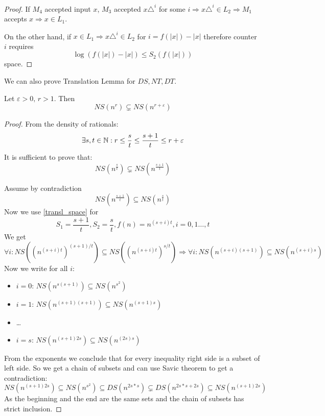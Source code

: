 \begin{proof}
If $M_4$ accepted input $x$, $M_3$ accepted $x\triangle^i$ for some $i \Rightarrow x\triangle^i \in L_2 \Rightarrow M_1$ accepts $x \Rightarrow x \in L_1$.

On the other hand, if $x \in L_1 \Rightarrow x\triangle^i \in L_2$ for $i = f(|x|) - |x|$ therefore counter $i$ requires
\[ \log(f(|x|) - |x|) \leq S_2(f(|x|)) \]
space.

\end{proof}

\begin{note}
	We can also prove Translation Lemma for $DS, NT, DT$.
\end{note}

\begin{theorem}
	Let $\varepsilon > 0,\, r > 1$. Then
	\[ NS(n^r) \subsetneq NS(n^{r + \varepsilon}) \]
\end{theorem}
\begin{proof}
	From the density of rationals:
	\[ \exists s,t \in \operatorname{\mathbb{N}}: r \leq \frac{s}{t} \leq \frac{s + 1}{t} \leq r + \varepsilon \]
	It is sufficient to prove that:
	\[ NS(n^{\frac{s}{t}}) \subsetneq NS(n^{\frac{s + 1}{t}}) \]

	Assume by contradiction
	\[ NS(n^{\frac{s+1}{t}}) \subseteq NS(n^{\frac{s}{t}}) \]
	Now we use \cref{transl_space} for
	\[ S_1 = \frac{s+1}{t}, S_2 = \frac{s}{t}, f(n) = n^{(s + i)t}, i = 0, 1 \ldots, t \]
	We get
	\[ \forall i: NS((n^{(s + i)t})^{(s + 1)/t}) \subseteq NS((n^{(s + i)t})^{s/t}) \Rightarrow \forall i: NS(n^{(s + i)(s + 1)}) \subseteq NS(n^{(s + i)s}) \]
	Now we write for all $i$:
	\begin{itemize}
		\item $i = 0:\, NS(n^{s(s + 1)}) \subseteq NS(n^{s^2}) $
		\item $i = 1:\, NS(n^{(s + 1)(s + 1)}) \subseteq NS(n^{(s + 1)s}) $
		\item \ldots
		\item $i = s:\, NS(n^{(s + 1)2s}) \subseteq NS(n^{(2s)s}) $
	\end{itemize}
	From the exponents we conclude that for every inequality right side is a subset of left side.
	So we get a chain of subsets and can use Savic theorem to get a contradiction:
	\[ NS(n^{(s + 1)2s}) \subseteq NS(n^{s^2}) \subseteq DS(n^{2s * s}) \subsetneq DS(n^{2s * s + 2s}) \subseteq NS(n^{(s + 1)2s}) \]
	As the beginning and the end are the same sets and the chain of subsets has strict inclusion.

\end{proof}
